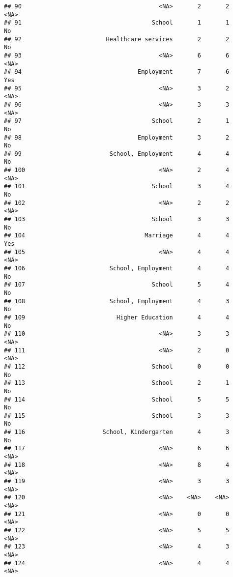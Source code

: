 \documentclass[
]{article}
\begin{document}
\begin{verbatim}
## 90                                       <NA>       2       2       <NA>
## 91                                     School       1       1         No
## 92                        Healthcare services       2       2         No
## 93                                       <NA>       6       6       <NA>
## 94                                 Employment       7       6        Yes
## 95                                       <NA>       3       2       <NA>
## 96                                       <NA>       3       3       <NA>
## 97                                     School       2       1         No
## 98                                 Employment       3       2         No
## 99                         School, Employment       4       4         No
## 100                                      <NA>       2       4       <NA>
## 101                                    School       3       4         No
## 102                                      <NA>       2       2       <NA>
## 103                                    School       3       3         No
## 104                                  Marriage       4       4        Yes
## 105                                      <NA>       4       4       <NA>
## 106                        School, Employment       4       4         No
## 107                                    School       5       4         No
## 108                        School, Employment       4       3         No
## 109                          Higher Education       4       4         No
## 110                                      <NA>       3       3       <NA>
## 111                                      <NA>       2       0       <NA>
## 112                                    School       0       0         No
## 113                                    School       2       1         No
## 114                                    School       5       5         No
## 115                                    School       3       3         No
## 116                      School, Kindergarten       4       3         No
## 117                                      <NA>       6       6       <NA>
## 118                                      <NA>       8       4       <NA>
## 119                                      <NA>       3       3       <NA>
## 120                                      <NA>    <NA>    <NA>       <NA>
## 121                                      <NA>       0       0       <NA>
## 122                                      <NA>       5       5       <NA>
## 123                                      <NA>       4       3       <NA>
## 124                                      <NA>       4       4       <NA>

\end{verbatim}
\end{document}
